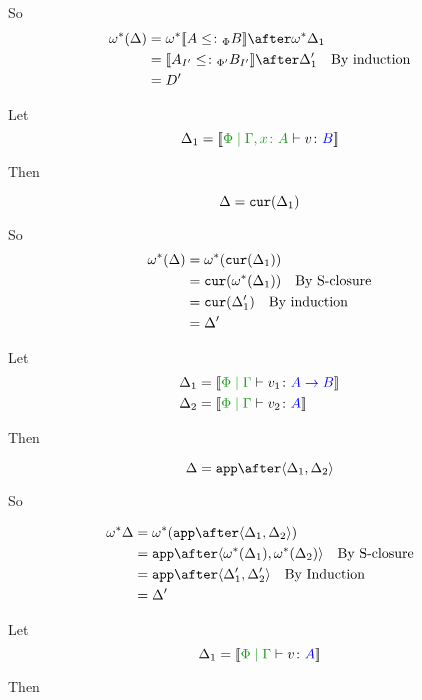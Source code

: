 \documentclass{report}
\begin{document}
So 
\begin{align*}
    \w\star(\D) & = \w\star{\deno{A\subtypep B}}\after\w\star\D_1 \\
    & = \deno{A_{I'}\subtypepp B_{I'}}\after\D_1'\qt{By induction}\\
    & = D'
\end{align*}

Let \begin{equation}
    \D_1 = \deno{\etyperelation{\P}{\gax}{v}{B}}
\end{equation}

Then

\begin{equation}
    \Delta = \texttt{cur}(\Delta_1)\\
\end{equation}

So
\begin{align*}
    \omega^*(\Delta) & = \omega^*(\texttt{cur}(\Delta_1))\\
    & = \texttt{cur}(\omega^*(\Delta_1))\quad\text{By S-closure}\\
    & = \texttt{cur}(\Delta_1')\quad\text{By induction}\\
    & = \Delta'
\end{align*}

Let \begin{align*}
    \D_1 &= \deno{\gpetyperelation{v_1}{\ab}}\\
    \D_2 &= \deno{\gpetyperelation{v_2}{A}}
\end{align*}

Then

\begin{equation}
    \D = \app\after\pr{\D_1}{\D_2}\\
\end{equation}

So

\begin{align*}
    \w\star\D & = \w\star(\app\after\pr{\D_1}{\D_2})\\
    & = \app\after\pr{\w\star(\D_1)}{\w\star(\D_2)}\qt{By S-closure}\\
    & = \app\after\pr{\D_1'}{\D_2'}\qt{By Induction}\\
    & = \D'
\end{align*}

Let \begin{equation}
    \D_1 = \deno{\gpetyperelation{v}{A}}
\end{equation}

Then
\end{document}
